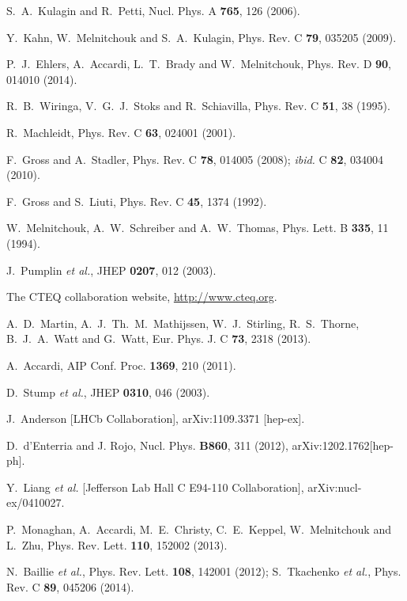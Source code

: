 \documentclass[aps,prd,amsmath,preprint]{revtex4}
\begin{document}
\begin{thebibliography}{99}
S.~A.~Kulagin and R.~Petti,
Nucl. Phys. A {\bf 765}, 126 (2006).

Y.~Kahn, W.~Melnitchouk and S.~A.~Kulagin,
Phys. Rev. C {\bf 79}, 035205 (2009).

P.~J.~Ehlers, A.~Accardi, L.~T.~Brady and W.~Melnitchouk,
Phys. Rev. D {\bf 90}, 014010 (2014).

R.~B.~Wiringa, V.~G.~J.~Stoks and R.~Schiavilla,
Phys. Rev. C {\bf 51}, 38 (1995).

R.~Machleidt,
Phys. Rev. C {\bf 63}, 024001 (2001).

F.~Gross and A.~Stadler,
Phys. Rev. C {\bf 78}, 014005 (2008);
{\it ibid.} C {\bf 82}, 034004 (2010).

F.~Gross and S.~Liuti,
Phys. Rev. C {\bf 45}, 1374 (1992).

W.~Melnitchouk, A.~W.~Schreiber and A.~W.~Thomas,
Phys. Lett. B {\bf 335}, 11 (1994).

J.~Pumplin {\it et al.},
JHEP {\bf 0207}, 012 (2003).
 

The CTEQ collaboration website,
\url{http://www.cteq.org}.

A.~D.~Martin, A.~J.~Th.~M.~Mathijssen, W.~J.~Stirling, R.~S.~Thorne, 
B.~J.~A.~Watt and G.~Watt,
Eur. Phys. J. C {\bf 73}, 2318 (2013).

A.~Accardi,
AIP Conf. Proc. {\bf 1369}, 210 (2011).

D.~Stump {\it et al.},
JHEP {\bf 0310}, 046 (2003).

J.~Anderson [LHCb Collaboration],
arXiv:1109.3371 [hep-ex].

D.~d'Enterria and J. Rojo, Nucl. Phys. {\bf B860}, 311 (2012), 
arXiv:1202.1762[hep-ph].

Y.~Liang {\it et al.} [Jefferson Lab Hall C E94-110 Collaboration],
arXiv:nucl-ex/0410027.

P.~Monaghan, A.~Accardi, M.~E.~Christy, C.~E.~Keppel, W.~Melnitchouk
and L.~Zhu,
Phys. Rev. Lett. {\bf 110}, 152002 (2013).

N.~Baillie {\it et al.},
Phys. Rev. Lett. {\bf 108}, 142001 (2012);
%
S.~Tkachenko {\it et al.},
Phys. Rev. C {\bf 89}, 045206 (2014).


\end{thebibliography}
\end{document}
